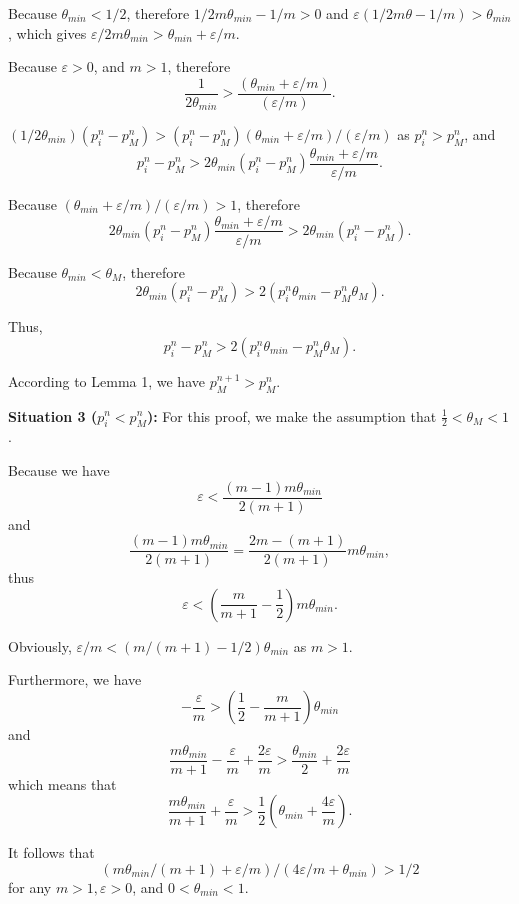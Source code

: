 \documentclass[10pt,journal,cspaper,compsoc,onecolumn]{IEEEtran}
\begin{document}
\begin{spacing}{1.3}
\begin{IEEEproof}
Because $\theta_{min} < 1/2$, therefore
$1/2m\theta_{min} - 1/m > 0$ and
$\varepsilon(1/2m\theta - 1/m) > \theta_{min}$, which gives
$\varepsilon/2m\theta_{min} > \theta_{min} + \varepsilon/m$.

Because $\varepsilon > 0$, and $m > 1$, therefore
 $$\displaystyle\frac{1}{2\theta_{min}} > \displaystyle\frac{(\theta_{min} + \varepsilon/m)}{(\varepsilon/m)}.$$

$(1/2\theta_{min})(p_i^n - p_M^n) > (p_i^n - p_M^n)(\theta_{min} + \varepsilon/m)/(\varepsilon/m)$ as
$p_i^n > p_M^n$, and
$$p_i^n -p_M^n > 2\theta_{min}(p_i^n -p_M^n)\displaystyle\frac{\theta_{min} + \varepsilon/m}{\varepsilon/m}.$$

Because $(\theta_{min} + \varepsilon/m)/(\varepsilon/m) > 1$, therefore
$$2\theta_{min}(p_i^n -p_M^n)\displaystyle\frac{\theta_{min} + \varepsilon/m}{\varepsilon/m} > 2\theta_{min}(p_i^n -p_M^n).$$

Because $\theta_{min} < \theta_M$, therefore
$$2\theta_{min}(p_i^n - p_M^n) > 2(p_i^n\theta_{min} - p_M^n\theta_M).$$

Thus,
$$p_i^n -p_M^n > 2(p_i^n\theta_{min} - p_M^n\theta_M).$$

According to Lemma 1, we have $p_M^{n + 1} > p_M^{n}$.

\textbf{Situation 3 ($p_i^n < p_M^n$):}
For this proof, we make the assumption that $\frac{1}{2} < \theta_M < 1$.

Because we have
$$\varepsilon < \displaystyle\frac{(m - 1)m\theta_{min}}{2(m + 1)}$$
and
$$\displaystyle\frac{(m - 1)m\theta_{min}}{2(m + 1)} = \displaystyle\frac{2m -(m + 1)}{2(m + 1)}m\theta_{min},$$
thus
$$\varepsilon < (\displaystyle\frac{m}{m +1} - \displaystyle\frac{1}{2})m\theta_{min}.$$

Obviously, $\varepsilon/m < (m/(m + 1) - 1/2)\theta_{min}$ as $m > 1$.

Furthermore, we have
$$-\displaystyle\frac{\varepsilon}{m} > (\displaystyle\frac{1}{2} - \displaystyle\frac{m}{m + 1})\theta_{min}$$
and
$$\displaystyle\frac{m\theta_{min}}{m + 1} - \displaystyle\frac{\varepsilon}{m} + \displaystyle\frac{2\varepsilon}{m} > \displaystyle\frac{\theta_{min}}{2} + \displaystyle\frac{2\varepsilon}{m}$$
which means that
$$\displaystyle\frac{m\theta_{min}}{m + 1} + \displaystyle\frac{\varepsilon}{m}  > \displaystyle\frac{1}{2}(\theta_{min} + \displaystyle\frac{4\varepsilon}{m}).$$

It follows that
$$(m\theta_{min}/(m + 1) + \varepsilon/m)/(4\varepsilon/m + \theta_{min}) > 1/2$$ for any $m > 1, \varepsilon > 0$, and $0 < \theta_{min} < 1$.


\end{IEEEproof}
\end{spacing}
\end{document}
